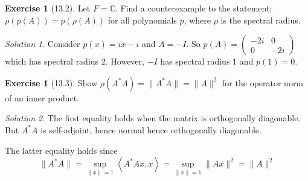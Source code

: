 \documentclass[reqno]{amsart}
\theoremstyle{definition}
\newtheorem{exercise}[theorem]{Exercise}
\theoremstyle{remark}
\newtheorem*{solution}{Solution}
\begin{document}
    \begin{exercise}[13.2]
        Let $F = \mathbb{C}$. Find a counterexample to the
        statement:
        $\rho \left( p \left( A \right)  \right) 
        = p \left( \rho(A) \right) $ for all polynomials
        $p$, where $\rho$ is the spectral radius. 
    \end{exercise}

    \begin{solution}

        Consider $p(x) = ix - i$ and
        $A = -I$. So
        $p(A) = \begin{pmatrix} -2i &0 \\0 & -2i \end{pmatrix} $ 
        which has spectral radius
        $2$. However,
        $-I$ has spectral radius $1$ and
        $p(1) = 0$.
    \end{solution}

    \begin{exercise}[13.3]
        Show $\rho \left( A^{*}A \right) 
        = \|A^{*}A\| = \|A\|^2$ for the
        operator
        norm of an inner product.
    \end{exercise}


    \begin{solution}
        The first equality holds when
        the matrix is orthogonally diagonable.
        But  $A^{*}A$ is self-adjoint, hence
        normal hence orthogonally diagonable.

        The latter equality holds since
        \[
        \|A^{*}A\| =
        \sup_{\|x\|=1} \left<A^{*}Ax, x \right>
        = \sup_{\|x\|=1} \|Ax\|^2
        = \|A\|^2
        \] 
    \end{solution}


























\end{document}
